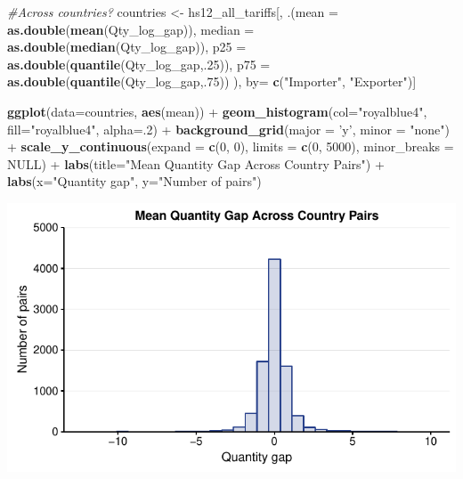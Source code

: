 \documentclass[10pt,]{article}
\newenvironment{Shaded}{\begin{snugshade}}{\end{snugshade}}
\newcommand{\KeywordTok}[1]{\textcolor[rgb]{0.13,0.29,0.53}{\textbf{{#1}}}}
\newcommand{\DataTypeTok}[1]{\textcolor[rgb]{0.13,0.29,0.53}{{#1}}}
\newcommand{\DecValTok}[1]{\textcolor[rgb]{0.00,0.00,0.81}{{#1}}}
\newcommand{\StringTok}[1]{\textcolor[rgb]{0.31,0.60,0.02}{{#1}}}
\newcommand{\CommentTok}[1]{\textcolor[rgb]{0.56,0.35,0.01}{\textit{{#1}}}}
\newcommand{\OtherTok}[1]{\textcolor[rgb]{0.56,0.35,0.01}{{#1}}}
\newcommand{\NormalTok}[1]{{#1}}
\begin{document}
\begin{Shaded}
\begin{Highlighting}[]
\CommentTok{#Across countries?}
\NormalTok{countries <-}\StringTok{ }\NormalTok{hs12_all_tariffs[, .(}\DataTypeTok{mean =} \KeywordTok{as.double}\NormalTok{(}\KeywordTok{mean}\NormalTok{(Qty_log_gap)),}
                                  \DataTypeTok{median =} \KeywordTok{as.double}\NormalTok{(}\KeywordTok{median}\NormalTok{(Qty_log_gap)),}
                                  \DataTypeTok{p25 =} \KeywordTok{as.double}\NormalTok{(}\KeywordTok{quantile}\NormalTok{(Qty_log_gap,.}\DecValTok{25}\NormalTok{)),}
                                  \DataTypeTok{p75 =} \KeywordTok{as.double}\NormalTok{(}\KeywordTok{quantile}\NormalTok{(Qty_log_gap,.}\DecValTok{75}\NormalTok{))}
\NormalTok{),}
\NormalTok{by=}\StringTok{ }\KeywordTok{c}\NormalTok{(}\StringTok{"Importer"}\NormalTok{, }\StringTok{"Exporter"}\NormalTok{)]}

\KeywordTok{ggplot}\NormalTok{(}\DataTypeTok{data=}\NormalTok{countries, }\KeywordTok{aes}\NormalTok{(mean)) +}
\StringTok{  }\KeywordTok{geom_histogram}\NormalTok{(}\DataTypeTok{col=}\StringTok{"royalblue4"}\NormalTok{,}
                 \DataTypeTok{fill=}\StringTok{"royalblue4"}\NormalTok{,}
                 \DataTypeTok{alpha=}\NormalTok{.}\DecValTok{2}\NormalTok{) +}
\StringTok{  }\KeywordTok{background_grid}\NormalTok{(}\DataTypeTok{major =} \StringTok{'y'}\NormalTok{, }\DataTypeTok{minor =} \StringTok{"none"}\NormalTok{) +}
\StringTok{  }\KeywordTok{scale_y_continuous}\NormalTok{(}\DataTypeTok{expand =} \KeywordTok{c}\NormalTok{(}\DecValTok{0}\NormalTok{, }\DecValTok{0}\NormalTok{), }\DataTypeTok{limits =} \KeywordTok{c}\NormalTok{(}\DecValTok{0}\NormalTok{, }\DecValTok{5000}\NormalTok{),  }\DataTypeTok{minor_breaks =} \OtherTok{NULL}\NormalTok{) +}
\StringTok{  }\KeywordTok{labs}\NormalTok{(}\DataTypeTok{title=}\StringTok{"Mean Quantity Gap Across Country Pairs"}\NormalTok{) +}
\StringTok{  }\KeywordTok{labs}\NormalTok{(}\DataTypeTok{x=}\StringTok{"Quantity gap"}\NormalTok{, }\DataTypeTok{y=}\StringTok{"Number of pairs"}\NormalTok{)}
\end{Highlighting}
\end{Shaded}

\begin{center}\includegraphics{Figs/qty_summary-6} \end{center}
\end{document}

